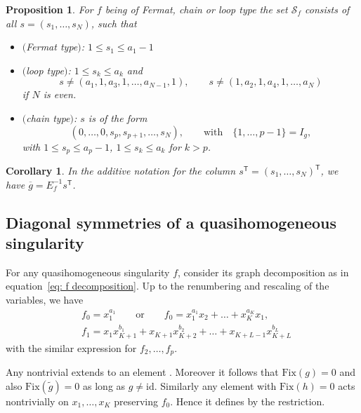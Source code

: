 \documentclass[10pt,a4paper]{amsart}
\numberwithin{equation}{section}
\newtheorem{Corollary}[Theorem]{Corollary}
\newtheorem{Proposition}[Theorem]{Proposition}
 { \theoremstyle{definition}
\newtheorem{Definition}[Theorem]{Definition}
\newtheorem{Note}[Theorem]{Note}
\newtheorem{Example}[Theorem]{Example}
\newtheorem{Remark}[Theorem]{Remark} }
\newcommand{\calS}{{\mathcal S}}
\newcommand{\Fix}{\mathrm{Fix}}
\newcommand{\id}{\mathrm{id}}
\begin{document}
\begin{Proposition}\label{proposition: chain loop group structure}
For $f$ being of Fermat, chain or loop type the set $\calS_f$ consists of all $s = (s_1,\dots,s_N)$, such that
	\begin{itemize}\itemsep=0pt
	 \item $($Fermat type$)$: $1 \le s_1 \le a_1-1$
	 \item $($loop type$)$: $1 \le s_k \le a_k$ and
	 \begin{equation*}\label{eq: vanishing r in loop}
		s \neq (a_1,1,a_3,1,\dots, a_{N-1},1), \qquad s \neq (1,a_2,1,a_4,1,\dots, a_{N})
	 \end{equation*}
	 if $N$ is even.
	 \item $($chain type$)$: $s$ is of the form
	 \begin{equation*}%
	 (0,\dots,0,s_p,s_{p+1},\dots,s_{N}), \qquad \text{with} \quad \{1,\dots,p-1\} = I_g,
	 \end{equation*}
	 with $1 \le s_{p} \le a_{p}-1$, $1 \le s_k \le a_k$ for $k > p$.
	\end{itemize}
\end{Proposition}

\begin{Corollary}
	In the additive notation for the column ${s^{\mathsf{T}} = (s_1,\dots,s_N)^{\mathsf{T}}}$, we have ${\overline g = E_f^{-1} s^{\mathsf{T}}}$\!.
\end{Corollary}

\subsection{Diagonal symmetries of a quasihomogeneous singularity}

For any quasihomogeneous singularity $f$, consider its graph decomposition as in equation~\eqref{eq: f decomposition}. Up to the renumbering and rescaling of the variables, we have
\begin{align*}
	& f_0 = x_1^{a_1} \qquad \text{or} \qquad f_0 = x_1^{a_1}x_2 + \dots + x_K^{a_K}x_1,
	\\
	& f_1 = x_1 x_{K+1}^{b_1} + x_{K+1}x_{K+2}^{b_2} + \dots + x_{K+L-1}x_{K+L}^{b_L}
\end{align*}
with the similar expression for $f_2, \dots, f_p$.

Any nontrivial  extends to an element . Moreover it follows that $\Fix(g) = 0$ and also $\Fix(\widetilde g) = 0$ as long as $g\ne\id$. Similarly any element  with $\Fix(h) = 0$ acts nontrivially on $x_1,\dots,x_K$ preserving $f_0$. Hence it defines  by the restriction.
\end{document}
